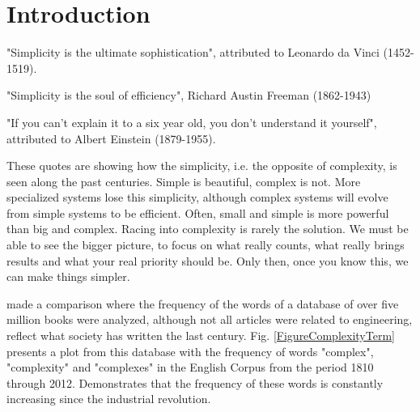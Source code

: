 \section{Introduction}
"Simplicity is the ultimate sophistication", attributed to Leonardo da Vinci (1452-1519).

"Simplicity is the soul of efficiency", Richard Austin Freeman (1862-1943)

"If you can't explain it to a six year old, you don't understand it yourself", attributed to Albert Einstein (1879-1955).

These quotes are showing how the simplicity, i.e. the opposite of complexity, is seen along the past centuries. Simple is beautiful, complex is not. 
More specialized systems lose this simplicity, although complex systems will evolve from simple systems to be efficient.
Often, small and simple is more powerful than big and complex. Racing into complexity is rarely the solution. We must be able to see the bigger picture, to focus on what really counts, what really brings results and what your real priority should be. Only then, once you know this, we can make things simpler.


\cite{Davies10} made a comparison where the frequency of the words of a database of over five million books were analyzed, although not all articles were related to engineering, reflect what society has written the last century. Fig. \ref{FigureComplexityTerm} presents a plot from this database with the frequency of words "complex", "complexity" and "complexes" in the English Corpus from the period 1810 through 2012. Demonstrates that the frequency of these words is constantly increasing since the industrial revolution.

